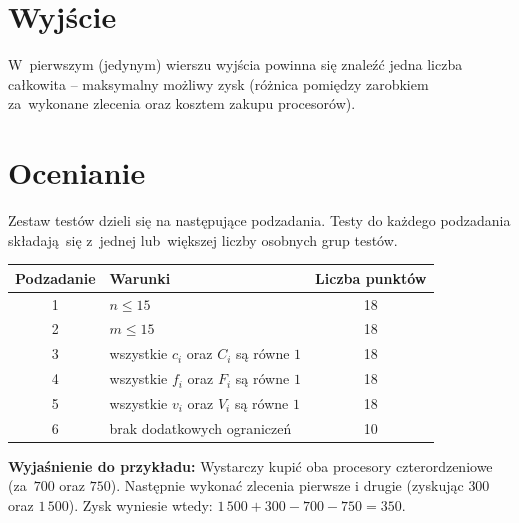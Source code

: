 \documentclass[zad,zawodnik,utf8]{sinol}
\begin{document}
\begin{tasktext}
    \section{Wyjście}
    W~pierwszym (jedynym) wierszu wyjścia powinna się znaleźć jedna liczba
    całkowita -- maksymalny możliwy zysk (różnica pomiędzy zarobkiem za~wykonane
    zlecenia oraz kosztem zakupu procesorów).

    \section{Ocenianie}
    Zestaw testów dzieli się na następujące podzadania.
    Testy do każdego podzadania składają~się z~jednej lub~większej liczby osobnych grup testów.

    \begin{center}
      \begin{tabular}{|c|p{6cm}|c|}
        \hline
        \textbf{Podzadanie} & \textbf{Warunki} & \textbf{Liczba punktów} \\ \hline
        1 & $n \le 15$ & 18 \\ \hline
        2 & $m \le 15$ & 18 \\ \hline
        3 & wszystkie $c_i$ oraz $C_i$ są równe $1$ & 18 \\ \hline
        4 & wszystkie $f_i$ oraz $F_i$ są równe $1$ & 18 \\ \hline
        5 & wszystkie $v_i$ oraz $V_i$ są równe $1$ & 18 \\ \hline
        6 & brak dodatkowych ograniczeń & 10 \\ \hline
      \end{tabular}
    \end{center}

    \makecompactexample

    \noindent
    \textbf{Wyjaśnienie do przykładu:}
    Wystarczy kupić oba procesory czterordzeniowe (za~$700$ oraz $750$).
    Następnie wykonać zlecenia pierwsze i drugie (zyskując $300$ oraz $1\,500$).
    Zysk wyniesie wtedy: $1\,500 + 300 - 700 - 750 = 350$.
  \end{tasktext}
\end{document}

